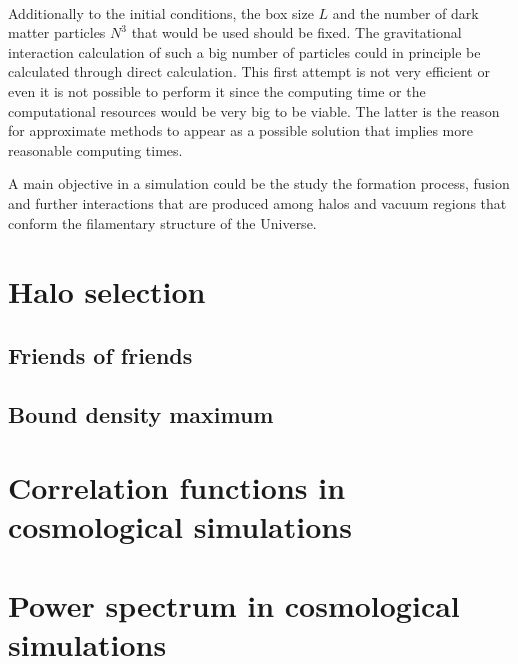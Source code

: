 \

Additionally to the initial conditions, the box size $L$ and the number of 
dark matter particles $N^3$ that would be used should be fixed. 
The gravitational interaction calculation of such a big number of particles
could in principle be calculated through direct calculation. This first
attempt is not very efficient or even it is not possible to perform it
since the computing time or the computational resources would be very 
big to be viable. The latter is the reason for approximate methods 
to appear as a possible solution that implies more reasonable computing times.

A main objective in a simulation could be the study the formation process, fusion and
further interactions that are produced among halos and vacuum regions that conform
the filamentary structure of the Universe. 


\section{ Halo selection }
\subsection{ Friends of friends }
\subsection{ Bound density maximum }



\section{ Correlation functions in cosmological simulations }



\section{ Power spectrum in cosmological simulations }

